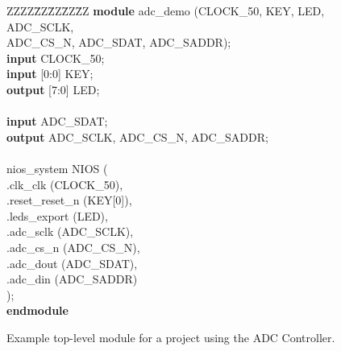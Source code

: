 \begin{figure}[h]

\begin{center} %
\parbox{12.5cm}{
\begin{tabbing}
ZZZZ\=ZZ\=ZZ\=ZZ\=ZZ\kill
{\bf module} adc\_demo (CLOCK\_50, KEY, LED, ADC\_SCLK, \\
\>\>\>\>ADC\_CS\_N, ADC\_SDAT, ADC\_SADDR);\\
\> {\bf input} CLOCK\_50;\\
\> {\bf input} [0:0] KEY;\\
\> {\bf output} [7:0] LED;\\
\\
\> {\bf input} ADC\_SDAT;\\
\> {\bf output}  ADC\_SCLK, ADC\_CS\_N, ADC\_SADDR;\\
\\
\>\>nios\_system NIOS (\\
\>\>\>.clk\_clk (CLOCK\_50),\\
\>\>\>.reset\_reset\_n (KEY[0]),\\
\>\>\>.leds\_export (LED),\\
\>\>\>.adc\_sclk (ADC\_SCLK),\\
\>\>\>.adc\_cs\_n (ADC\_CS\_N),\\
\>\>\>.adc\_dout (ADC\_SDAT),\\
\>\>\>.adc\_din (ADC\_SADDR)\\
\>\>);\\
{\bf endmodule}
\end{tabbing} } %
	\caption{Example top-level module for a project using the ADC Controller.}
	\label{fig:top_level}
\end{center}
\end{figure}
